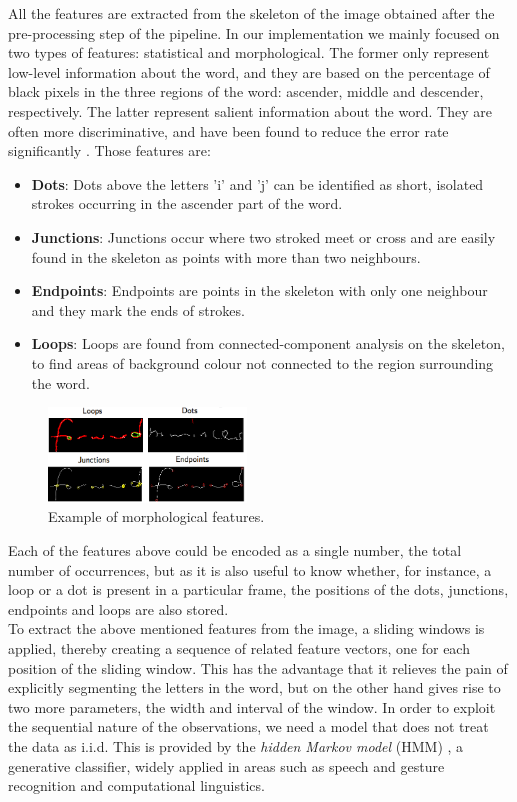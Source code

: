 \documentclass[conference]{IEEEtran}
\begin{document}
All the features are extracted from the skeleton of the image obtained after the pre-processing step of the pipeline. In our implementation we mainly focused on two types of features: statistical and morphological. The former only represent low-level information about the word, and they are based on the percentage of black pixels in the three regions of the word: ascender, middle and descender, respectively. The latter represent salient information about the word. They are often more discriminative, and have been found to reduce the error rate significantly \cite{10.1109/34.667887}. Those features are:
\begin{itemize}
\item {\bf Dots}: Dots above the letters 'i' and 'j' can be identified as short, isolated strokes occurring in the ascender part of the word.
\item {\bf Junctions}: Junctions occur where two stroked meet or cross and are easily found in the skeleton as points with more than two neighbours.
\item {\bf Endpoints}: Endpoints are points in the skeleton with only one neighbour and they mark the ends of strokes. 
\item {\bf Loops}: Loops are found from connected-component analysis on the skeleton, to find areas of background colour not connected to the region surrounding the word. 
\end{itemize}

\begin{figure}
 \centering
\includegraphics[width=0.47\textwidth]{features2.png}
\caption{Example of morphological features.}
\label{fig:pipeline}
\end{figure}
Each of the features above could be encoded as a single number, the total number of occurrences, but as it is also useful to know whether, for instance, a loop or a dot is present in a particular frame, the positions of the dots, junctions, endpoints and loops are also stored. \\

To extract the above mentioned features from the image, a sliding windows is applied, thereby creating a sequence of related feature vectors, one for each position of the sliding window. This has the advantage that it relieves the pain of explicitly segmenting the letters in the word, but on the other hand gives rise to two more parameters, the width and interval of the window. In order to exploit the sequential nature of the observations, we need a model that does not treat the data as i.i.d. This is provided by the {\it hidden Markov model} (HMM) \cite{rabiner-89,Rabiner86Z27}, a generative classifier, widely applied in areas such as speech and gesture recognition and computational linguistics.
\end{document}

